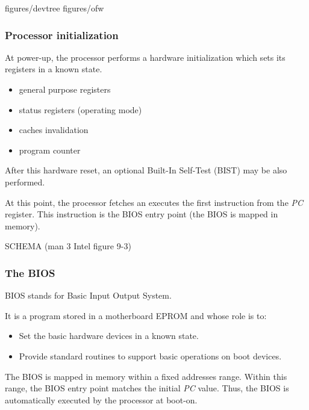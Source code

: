 %
%
%
%
%
%

%
%


		{figures/devtree}
		{figures/ofw}

%
%

\begin{frame}
  \frametitle{Processor initialization}

  At power-up, the processor performs a hardware initialization which sets its registers in a known state.

  \-

  \begin{itemize}
  \item general purpose registers
  \item status registers (operating mode)
  \item caches invalidation
  \item program counter
  \end{itemize}

  \-

  After this hardware reset, an optional Built-In Self-Test (BIST) may be also performed.

  \-

  At this point, the processor fetches an executes the first instruction from the {\em PC} register. This instruction is the BIOS entry point (the BIOS is mapped in memory).

  \-

  SCHEMA (man 3 Intel figure 9-3)

\end{frame}

%
%
%

\begin{frame}
  \frametitle{The BIOS}

  BIOS stands for Basic Input Output System.

  \-

  It is a program stored in a motherboard EPROM and whose role is to:
  \begin{itemize}
  \item Set the basic hardware devices in a known state.
  \item Provide standard routines to support basic operations on boot devices.
  \end{itemize}

  \-

  The BIOS is mapped in memory within a fixed addresses range. Within this range, the BIOS entry point matches the initial {\em PC} value. Thus, the BIOS is automatically executed by the processor at boot-on.

\end{frame}

